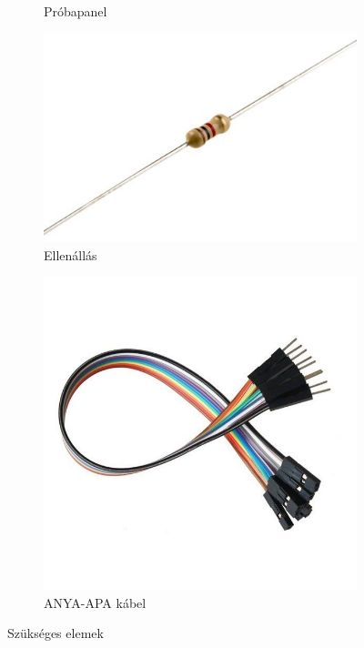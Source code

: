 \documentclass[a4paper,12pt]{report}
\begin{document}
\begin{figure}[h!]
\begin{subfigure}[b]{0.4\linewidth}
            \caption{Próbapanel}
        \end{subfigure}
        \begin{subfigure}[b]{0.4\linewidth}
            \includegraphics[width=\linewidth]{images/ellenallas.jpg}
            \caption{Ellenállás}
        \end{subfigure}
        \begin{subfigure}[b]{0.4\linewidth}
            \includegraphics[width=\linewidth]{images/anyaapa.jpg}
            \caption{ANYA-APA kábel}
        \end{subfigure}
        \caption{Szükséges elemek}
        \label{fig:lampaelemek}
    \end{figure}
\end{document}
